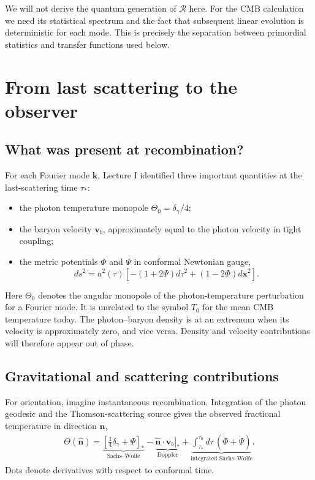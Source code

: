 \documentclass[12pt]{article}
\newcommand{\be}{\begin{eqnarray}}
\newcommand{\ee}{\end{eqnarray}}
\newcommand{\Rs}{\mathcal R}
\newcommand{\bk}{\mathbf k}
\newcommand{\bx}{\mathbf x}
\newcommand{\bn}{\hat{\mathbf n}}
\newcommand{\bv}{\mathbf v}
\begin{document}
We will not derive the quantum generation of $\Rs$ here. For the CMB calculation we
need its statistical spectrum and the fact that subsequent linear evolution is
deterministic for each mode. This is precisely the separation between primordial
statistics and transfer functions used below.

\section{From last scattering to the observer}

\subsection{What was present at recombination?}
For each Fourier mode $\bk$, Lecture I identified three important quantities at the
last-scattering time $\tau_*$:
\begin{itemize}
\item the photon temperature monopole $\Theta_0=\delta_\gamma/4$;
\item the baryon velocity $\bv_b$, approximately equal to the photon velocity in tight coupling;
\item the metric potentials $\Phi$ and $\Psi$ in conformal Newtonian gauge,
\[
ds^2=a^2(\tau)\left[-(1+2\Psi)d\tau^2+(1-2\Phi)d\bx^2\right].
\]
\end{itemize}
Here $\Theta_0$ denotes the angular monopole of the photon-temperature perturbation
for a Fourier mode. It is unrelated to the symbol $T_0$ for the mean CMB temperature
today.
The photon--baryon density is at an extremum when its velocity is approximately zero,
and vice versa. Density and velocity contributions will therefore appear out of phase.

\subsection{Gravitational and scattering contributions}
For orientation, imagine instantaneous recombination. Integration of the photon
geodesic and the Thomson-scattering source gives the observed fractional temperature
in direction $\bn$,
\be
\boxed{
\Theta(\bn)=
\underbrace{\left[\frac14\delta_\gamma+\Psi\right]_*}_{\text{Sachs--Wolfe}}
-\underbrace{\left.\bn\cdot\bv_b\right|_*}_{\text{Doppler}}
+\underbrace{\int_{\tau_*}^{\tau_0}d\tau\,(\dot\Phi+\dot\Psi)}_{\text{integrated Sachs--Wolfe}}.}
\label{eq:SWDopplerISW}
\ee
Dots denote derivatives with respect to conformal time.
\end{document}
